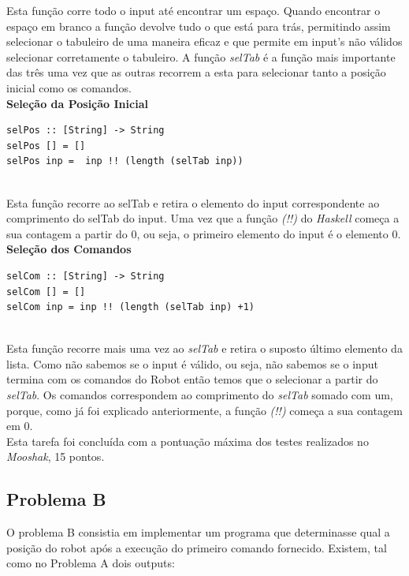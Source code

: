 \documentclass[a4paper,12pt,portuges]{article}
\begin{document}
Esta função corre todo o input até encontrar um espaço. Quando encontrar o espaço em branco a função devolve tudo o que está para trás, permitindo assim selecionar o tabuleiro de uma maneira eficaz e que permite em input's não válidos selecionar corretamente o tabuleiro. A função \textit{selTab} é a função mais importante das três uma vez que as outras recorrem a esta para selecionar tanto a posição inicial como os comandos.\\

\textbf{Seleção da Posição Inicial}
\begin{verbatim}
selPos :: [String] -> String
selPos [] = []
selPos inp =  inp !! (length (selTab inp))
\end{verbatim}
\\
Esta função recorre ao selTab e retira o elemento do input correspondente ao comprimento do selTab do input. Uma vez que a função  \textit{(!!)} do \textit{Haskell} começa a sua contagem a partir do 0, ou seja, o primeiro elemento do input é o elemento 0.\\

\textbf{Seleção dos Comandos}
\begin{verbatim}
selCom :: [String] -> String
selCom [] = []
selCom inp = inp !! (length (selTab inp) +1)
\end{verbatim}
\\

Esta função recorre mais uma vez ao \textit{selTab} e retira o suposto último elemento da lista. Como não sabemos se o input é válido, ou seja, não sabemos se o input termina com os comandos do Robot então temos que o selecionar a partir do \textit{selTab}. Os comandos correspondem ao comprimento do \textit{selTab} somado com um, porque, como já foi explicado anteriormente, a função \textit{(!!)} começa a sua contagem em 0.\\

Esta tarefa foi concluída com a pontuação máxima dos testes realizados no \textit{Mooshak}, 15 pontos.\\

\subsection {Problema B}

O problema B consistia em implementar um programa que determinasse qual a posição do robot após a execução do primeiro comando fornecido. Existem, tal como no Problema A dois outputs:\\
\end{document}
